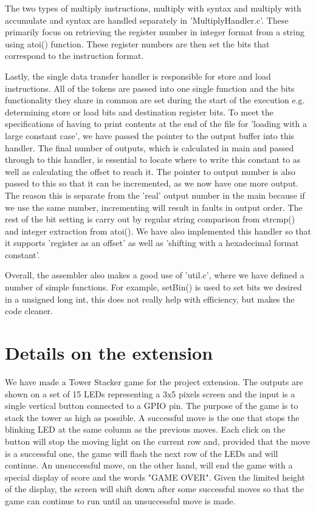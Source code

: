 \documentclass[11pt]{article}
\begin{document}
\medskip

The two types of multiply instructions, multiply with syntax and multiply with accumulate and syntax are handled separately in 'MultiplyHandler.c'. These primarily focus on retrieving the register number in integer format from a string using atoi() function. These register numbers are then set the bits that correspond to the instruction format. 

\medskip
	
Lastly, the single data transfer handler is responsible for store and load instructions. All of the tokens are passed into one single function and the bits functionality they share in common are set during the start of the execution e.g. determining store or load bits and destination register bits. To meet the specifications of having to print contents at the end of the file for 'loading with a large constant case', we have passed the pointer to the output buffer into this handler. The final number of outputs, which is calculated in main and passed through to this handler, is essential to locate where to write this constant to as well as calculating the offset to reach it. The pointer to output number is also passed to this so that it can be incremented, as we now have one more output. The reason this is separate from the 'real' output number in the main because if we use the same number, incrementing will result in faults in output order. The rest of the bit setting is carry out by regular string comparison from strcmp() and integer extraction from atoi(). We have also implemented this handler so that it supports 'register as an offset' as well as 'shifting with a hexadecimal format constant'.

\medskip
	
Overall, the assembler also makes a good use of 'util.c', where we have defined a number of simple functions. For example, setBin() is used to set bits we desired in a unsigned long int, this does not really help with efficiency, but makes the code cleaner. 

\section{Details on the extension}

We have made a Tower Stacker game for the project extension. The outputs are shown on a set of 15 LEDs representing a 3x5 pixels screen and the input is a single vertical button connected to a GPIO pin. The purpose of the game is to stack the tower as high as possible. A successful move is the one that stops the blinking LED at the same column as the previous moves.  Each click on the button will stop the moving light on the current row and, provided that the move is a successful one, the game will flash the next row of the LEDs and will continue. An unsuccessful move, on the other hand, will end the game with a special display of score and the words "GAME OVER". Given the limited height of the display, the screen will shift down after some successful moves so that the game can continue to run until an unsuccessful move is made. 
\end{document}

